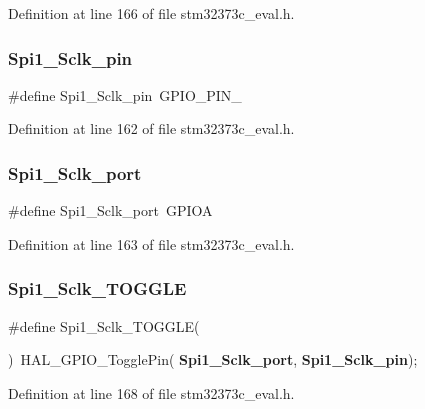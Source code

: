 Definition at line 166 of file stm32373c\+\_\+eval.\+h.

\mbox{\label{group___l_e_d_ga5fea11d2a1be8e1140eefe4548b1b726}} 
\subsubsection{Spi1\+\_\+\+Sclk\+\_\+pin}
{\footnotesize\ttfamily \#define Spi1\+\_\+\+Sclk\+\_\+pin~G\+P\+I\+O\+\_\+\+P\+I\+N\+\_}



Definition at line 162 of file stm32373c\+\_\+eval.\+h.

\mbox{\label{group___l_e_d_gad0f4a72b6a6adebf55ee68545cae2444}} 
\subsubsection{Spi1\+\_\+\+Sclk\+\_\+port}
{\footnotesize\ttfamily \#define Spi1\+\_\+\+Sclk\+\_\+port~G\+P\+I\+OA}



Definition at line 163 of file stm32373c\+\_\+eval.\+h.

\mbox{\label{group___l_e_d_gab27c063cbf16f67015f72239452f2f93}} 
\subsubsection{Spi1\+\_\+\+Sclk\+\_\+\+T\+O\+G\+G\+LE}
{\footnotesize\ttfamily \#define Spi1\+\_\+\+Sclk\+\_\+\+T\+O\+G\+G\+LE(\begin{DoxyParamCaption}{ }\end{DoxyParamCaption})~H\+A\+L\+\_\+\+G\+P\+I\+O\+\_\+\+Toggle\+Pin(\textbf{ Spi1\+\_\+\+Sclk\+\_\+port},\textbf{ Spi1\+\_\+\+Sclk\+\_\+pin});}



Definition at line 168 of file stm32373c\+\_\+eval.\+h.

\mbox{\label{group___l_e_d_ga6a4cea9578ee71904816783bd2b499f6}} 
